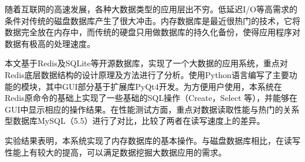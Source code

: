 \begin{abstractc}
随着互联网的高速发展，各种大数据类型的应用层出不穷。低延迟I/O等高需求的条件对传统的磁盘数据库产生了很大冲击。内存数据库是最近很热门的技术，它将数据完全放在内存中，而传统的硬盘只用做数据库的持久化备份，使得应用程序对数据有极高的处理速度。

本文基于Redis及SQLite等开源数据库，实现了一个大数据的应用系统，重点对Redis底层数据结构的设计原理及方法进行了分析。使用Python语言编写了主要功能的模块，其中GUI部分基于扩展库PyQt4开发。为方便用户使用，本系统在Redis原命令的基础上实现了一些基础的SQL操作（Create，Select 等），并能够在GUI中显示相应的操作结果。在性能测试方面，重点对数据读取性能与热门的关系型数据库MySQL（5.5）进行了对比，比较了两者在读写速度上的差异。

实验结果表明，本系统实现了内存数据库的基本操作。与磁盘数据库相比，在读写性能上有较大的提高，可以满足数据挖掘大数据应用的需求。



\end{abstractc}
